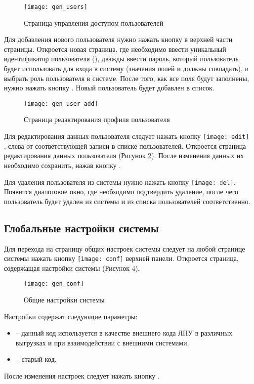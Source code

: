 \begin{figure}[ht]\centering
 \texttt{[image: gen\_users]}
 \caption{Страница управления доступом пользователей}
 \label{img_gen_users}
\end{figure} 

Для добавления нового пользователя нужно нажать кнопку   в верхней части страницы. Откроется новая страница, где необходимо ввести уникальный идентификатор пользователя (), дважды ввести пароль, который пользователь будет использовать для входа в систему (значения полей  и  должны совпадать), и выбрать роль пользователя в системе. После того, как все поля будут заполнены, нужно нажать кнопку . Новый пользователь будет добавлен в список.

\begin{figure}[ht]\centering
 \texttt{[image: gen\_user\_add]}
 \caption{Страница редактирования профиля пользователя}
 \label{img_gen_user_add}
\end{figure}

Для редактирования данных пользователя следует нажать кнопку \texttt{[image: edit]} , слева от соответствующей записи в списке пользователей. Откроется страница редактирования данных пользователя (Рисунок \ref{img_gen_user_add}). После изменения данных их необходимо сохранить, нажав кнопку .

Для удаления пользователя из системы нужно нажать кнопку \texttt{[image: del]}. Появится диалоговое окно, где необходимо подтвердить удаление, после чего пользователь будет удален из системы и из списка пользователей соответственно.

\subsection{Глобальные настройки системы} \label{gen_conf}

Для перехода на страницу общих настроек системы следует на любой странице системы нажать кнопку \texttt{[image: conf]}  верхней панели. Откроется страница, содержащая настройки системы (Рисунок 4).

\begin{figure}[ht]\centering
 \texttt{[image: gen\_conf]}
 \caption{Общие настройки системы}
 \label{img_gen_conf}
\end{figure}

Настройки содержат следующие параметры:
\begin{itemize}
 \item {} – данный код используется в качестве внешнего кода ЛПУ в различных выгрузках и при взаимодействии с внешними системами.
 \item {} – старый код.
\end{itemize}
 
После изменения настроек следует нажать кнопку .
